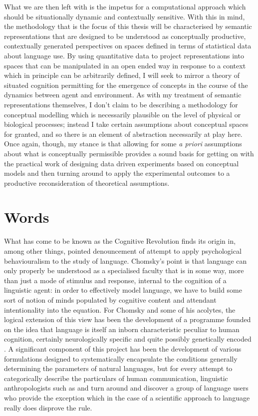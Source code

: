 What we are then left with is the impetus for a computational approach which should be situationally dynamic and contextually sensitive.  With this in mind, the methodology that is the focus of this thesis will be characterised by semantic representations that are designed to be understood as conceptually productive, contextually generated perspectives on spaces defined in terms of statistical data about language use.  By using quantitative data to project representations into spaces that can be manipulated in an open ended way in response to a context which in principle can be arbitrarily defined, I will seek to mirror a theory of situated cognition permitting for the emergence of concepts in the course of the dynamics between agent and environment.  As with my treatment of semantic representations themselves, I don't claim to be describing a methodology for conceptual modelling which is necessarily plausible on the level of physical or biological processes; instead I take certain assumptions about conceptual spaces for granted, and so there is an element of abstraction necessarily at play here.  Once again, though, my stance is that allowing for some \emph{a priori} assumptions about what is conceptually permissible provides a sound basis for getting on with the practical work of designing data driven experiments based on conceptual models and then turning around to apply the experimental outcomes to a productive reconsideration of theoretical assumptions.

\section{Words} \label{sec:words}
What has come to be known as the Cognitive Revolution finds its origin in, among other things,  pointed denouncement of  attempt to apply psychological behaviouralism to the study of language.  Chomsky's point is that language can only properly be understood as a specialised faculty that is in some way, more than just a mode of stimulus and response, internal to the cognition of a linguistic agent: in order to effectively model language, we have to build some sort of notion of minds populated by cognitive content and attendant intentionality into the equation.  For Chomsky and some of his acolytes, the logical extension of this view has been the development of a programme founded on the idea that language is itself an inborn characteristic peculiar to human cognition, certainly neurologically specific and quite possibly genetically encoded \citep{Chomsky1986, Pinker1994, Fodor2001}.  A significant component of this project has been the development of various formulations designed to systematically encapsulate the conditions generally determining the parameters of natural languages, but for every attempt to categorically describe the particulars of human communication, linguistic anthropologists such as \cite{Levinson2001} and \cite{Everett2005} turn around and discover a group of language users who provide the exception which in the case of a scientific approach to language really does disprove the rule.

